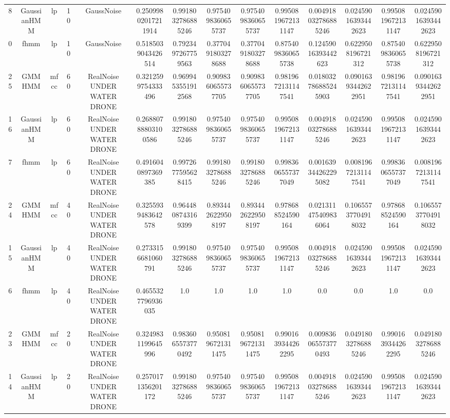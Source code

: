 \begin{table}[htb]
\begin{tabular}{@{}cccccccccccccc@{}}
        8 & GaussianHMM & lp & 10 & GaussNoise & 0.25099802017211914 & 0.9918032786885246 & 0.9754098360655737 & 0.9754098360655737 & 0.9950819672131147 & 0.004918032786885246 & 0.02459016393442623 & 0.9950819672131147 & 0.02459016393442623 \\
        0 & fhmm & lp & 10 & GaussNoise & 0.5185039043426514 & 0.7923497267759563 & 0.3770491803278688 & 0.3770491803278688 & 0.8754098360655738 & 0.12459016393442623 & 0.6229508196721312 & 0.8754098360655738 & 0.6229508196721312 \\
        25 & GMMHMM & mfcc & 60 & RealNoise UNDER WATER DRONE & 0.3212599754333496 & 0.9699453551912568 & 0.9098360655737705 & 0.9098360655737705 & 0.9819672131147541 & 0.018032786885245903 & 0.09016393442622951 & 0.9819672131147541 & 0.09016393442622951 \\
        16 & GaussianHMM & lp & 60 & RealNoise UNDER WATER DRONE & 0.26880788803100586 & 0.9918032786885246 & 0.9754098360655737 & 0.9754098360655737 & 0.9950819672131147 & 0.004918032786885246 & 0.02459016393442623 & 0.9950819672131147 & 0.02459016393442623 \\
        7 & fhmm & lp & 60 & RealNoise UNDER WATER DRONE & 0.4916040897369385 & 0.9972677595628415 & 0.9918032786885246 & 0.9918032786885246 & 0.9983606557377049 & 0.001639344262295082 & 0.00819672131147541 & 0.9983606557377049 & 0.00819672131147541 \\
        24 & GMMHMM & mfcc & 40 & RealNoise UNDER WATER DRONE & 0.3255939483642578 & 0.9644808743169399 & 0.8934426229508197 & 0.8934426229508197 & 0.978688524590164 & 0.021311475409836064 & 0.10655737704918032 & 0.978688524590164 & 0.10655737704918032 \\
        15 & GaussianHMM & lp & 40 & RealNoise UNDER WATER DRONE & 0.2733156681060791 & 0.9918032786885246 & 0.9754098360655737 & 0.9754098360655737 & 0.9950819672131147 & 0.004918032786885246 & 0.02459016393442623 & 0.9950819672131147 & 0.02459016393442623 \\
        6 & fhmm & lp & 40 & RealNoise UNDER WATER DRONE & 0.4655327796936035 & 1.0 & 1.0 & 1.0 & 1.0 & 0.0 & 0.0 & 1.0 & 0.0 \\
        23 & GMMHMM & mfcc & 20 & RealNoise UNDER WATER DRONE & 0.3249831199645996 & 0.9836065573770492 & 0.9508196721311475 & 0.9508196721311475 & 0.9901639344262295 & 0.009836065573770493 & 0.04918032786885246 & 0.9901639344262295 & 0.04918032786885246 \\
        14 & GaussianHMM & lp & 20 & RealNoise UNDER WATER DRONE & 0.2570171356201172 & 0.9918032786885246 & 0.9754098360655737 & 0.9754098360655737 & 0.9950819672131147 & 0.004918032786885246 & 0.02459016393442623 & 0.9950819672131147 & 0.02459016393442623 \\

\end{tabular}
\end{table}
